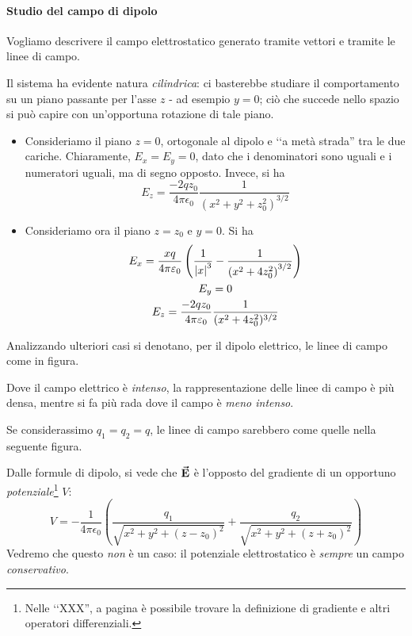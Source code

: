 \paragraph{Studio del campo di dipolo}
Vogliamo descrivere il campo elettrostatico generato tramite vettori e tramite le linee di campo.
\begin{observe}
	Il sistema ha evidente natura \textit{cilindrica}: ci basterebbe studiare il comportamento su un piano passante per l'asse $z$ - ad esempio $y=0$; ciò che succede nello spazio si può capire con un'opportuna rotazione di tale piano.
\end{observe}
\begin{itemize}
	\item Consideriamo il piano $z=0$, ortogonale al dipolo e ‘‘a metà strada'' tra le due cariche.
	Chiaramente, $E_x=E_y=0$, dato che i denominatori sono uguali e i numeratori uguali, ma di segno opposto. Invece, si ha
	\begin{equation*}
		E_z=\frac{-2qz_0}{4\pi\epsilon_0}\frac{1}{\left(x^2+y^2+z_0^2\right)^{3/2}}
	\end{equation*}
	\item Consideriamo ora il piano $z=z_0$ e $y=0$. Si ha
	\begin{gather*}
		E_x=\frac{xq}{4\pi\varepsilon_0}\left(\frac{1}{\abs{x}^3}-\frac{1}{\left(x^2+4z_0^2\right)^{3/2}}\right)\\
		E_y=0\\
		E_z=\frac{-2qz_0}{4\pi\varepsilon_0}\frac{1}{(x^2+4z_0^2)^{3/2}}
	\end{gather*}
\end{itemize}
Analizzando ulteriori casi si denotano, per il dipolo elettrico, le linee di campo come in figura.
\begin{observe}
	Dove il campo elettrico è \textit{intenso}, la rappresentazione delle linee di campo è più densa, mentre si fa più rada dove il campo è \textit{meno intenso}.
\end{observe}
Se considerassimo $q_1=q_2=q$, le linee di campo sarebbero come quelle nella seguente figura.
\begin{observe}%
	Dalle formule di dipolo, si vede che $\vb*{\va{E}}$ è l'opposto del gradiente di un opportuno \textit{potenziale}\footnote{Nelle ‘‘XXX'', a pagina \pageref{gradiente} è possibile trovare la definizione di gradiente e altri operatori differenziali.} $V$:
	\begin{equation}
		V=-\frac{1}{4\pi\epsilon_0}\left(\frac{q_1}{\sqrt{x^2+y^2+(z-z_0)^2}}+\frac{q_2}{\sqrt{x^2+y^2+(z+z_0)^2}}\right)
	\end{equation}
Vedremo che questo \textit{non} è un caso: il potenziale elettrostatico è \textit{sempre} un campo \textit{conservativo}.
\end{observe}
